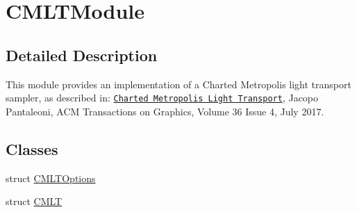 \hypertarget{group___c_m_l_t_module}{}\section{C\+M\+L\+T\+Module}
\label{group___c_m_l_t_module}


\subsection{Detailed Description}
This module provides an implementation of a Charted Metropolis light transport sampler, as described in\+: \href{https://arxiv.org/abs/1612.05395}{\tt Charted Metropolis Light Transport}, Jacopo Pantaleoni, A\+CM Transactions on Graphics, Volume 36 Issue 4, July 2017. \subsection*{Classes}
\begin{DoxyCompactItemize}
\item 
struct \hyperlink{struct_c_m_l_t_options}{C\+M\+L\+T\+Options}
\item 
struct \hyperlink{struct_c_m_l_t}{C\+M\+LT}
\end{DoxyCompactItemize}
